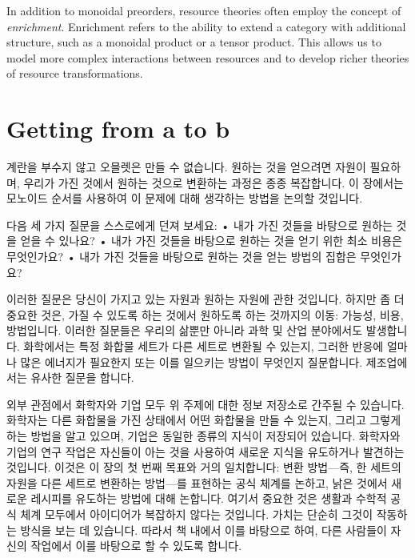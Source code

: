 \documentclass[11pt, a4paper, twoside, openany]{book}
\begin{document}
\par\medskip
In addition to monoidal preorders, resource theories often employ the concept of \textit{enrichment}. Enrichment refers to the ability to extend a category with additional structure, such as a monoidal product or a tensor product. This allows us to model more complex interactions between resources and to develop richer theories of resource transformations.


\section{Getting from a to b}
\label{sec:2-1}

계란을 부수지 않고 오믈렛은 만들 수 없습니다. 원하는 것을 얻으려면 자원이 필요하며, 우리가 가진 것에서 원하는 것으로 변환하는 과정은 종종 복잡합니다. 이 장에서는 모노이드 순서를 사용하여 이 문제에 대해 생각하는 방법을 논의할 것입니다.

\par\medskip
다음 세 가지 질문을 스스로에게 던져 보세요:
• 내가 가진 것들을 바탕으로 원하는 것을 얻을 수 있나요?
• 내가 가진 것들을 바탕으로 원하는 것을 얻기 위한 최소 비용은 무엇인가요?
• 내가 가진 것들을 바탕으로 원하는 것을 얻는 방법의 집합은 무엇인가요?

\par\medskip
이러한 질문은 당신이 가지고 있는 자원과 원하는 자원에 관한 것입니다. 하지만 좀 더 중요한 것은, 가질 수 있도록 하는 것에서 원하도록 하는 것까지의 이동: 가능성, 비용, 방법입니다.
이러한 질문들은 우리의 삶뿐만 아니라 과학 및 산업 분야에서도 발생합니다. 화학에서는 특정 화합물 세트가 다른 세트로 변환될 수 있는지, 그러한 반응에 얼마나 많은 에너지가 필요한지 또는 이를 일으키는 방법이 무엇인지 질문합니다. 제조업에서는 유사한 질문을 합니다.

\par\medskip
외부 관점에서 화학자와 기업 모두 위 주제에 대한 정보 저장소로 간주될 수 있습니다. 화학자는 다른 화합물을 가진 상태에서 어떤 화합물을 만들 수 있는지, 그리고 그렇게 하는 방법을 알고 있으며, 기업은 동일한 종류의 지식이 저장되어 있습니다. 화학자와 기업의 연구 작업은 자신들이 아는 것을 사용하여 새로운 지식을 유도하거나 발견하는 것입니다.
이것은 이 장의 첫 번째 목표와 거의 일치합니다: 변환 방법—즉, 한 세트의 자원을 다른 세트로 변환하는 방법—를 표현하는 공식 체계를 논하고, 낡은 것에서 새로운 레시피를 유도하는 방법에 대해 논합니다. 여기서 중요한 것은 생활과 수학적 공식 체계 모두에서 아이디어가 복잡하지 않다는 것입니다. 가치는 단순히 그것이 작동하는 방식을 보는 데 있습니다. 따라서 책 내에서 이를 바탕으로 하여, 다른 사람들이 자신의 작업에서 이를 바탕으로 할 수 있도록 합니다.
\end{document}
